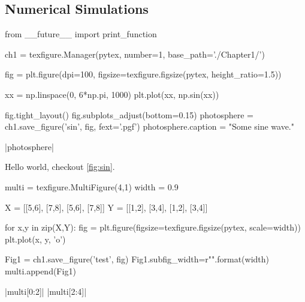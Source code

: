 \subsection{Numerical Simulations}
































\begin{pycode}[chapter1]
from __future__ import print_function

ch1 = texfigure.Manager(pytex, number=1, base_path='./Chapter1/')
\end{pycode}

\begin{pycode}[chapter1]
fig = plt.figure(dpi=100, figsize=texfigure.figsize(pytex, height_ratio=1.5))

xx = np.linspace(0, 6*np.pi, 1000)
plt.plot(xx, np.sin(xx))

fig.tight_layout()
fig.subplots_adjust(bottom=0.15)
photosphere = ch1.save_figure('sin', fig, fext='.pgf')
photosphere.caption = "Some sine wave."
\end{pycode}

\py[chapter1]|photosphere|



Hello world, checkout \cref{fig:sin}.


\begin{pycode}[chapter1]
	
multi = texfigure.MultiFigure(4,1)
width = 0.9

X = [[5,6], [7,8], [5,6], [7,8]]
Y = [[1,2], [3,4], [1,2], [3,4]]

for x,y in zip(X,Y):
	fig = plt.figure(figsize=texfigure.figsize(pytex, scale=width))
	plt.plot(x, y, 'o')
	
	Fig1 = ch1.save_figure('test', fig)
	Fig1.subfig_width=r"{}\columnwidth".format(width)
	multi.append(Fig1)
\end{pycode}

\py[chapter1]|multi[0:2]|
\py[chapter1]|multi[2:4]|